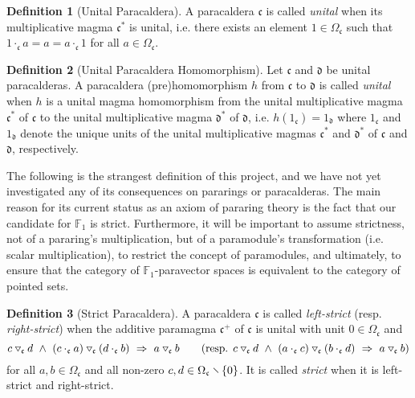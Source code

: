 \documentclass{article}
\theoremstyle{definition}
\newtheorem{definition}{Definition}[section]
\newcommand{\impl}{~\Rightarrow~}
\newcommand{\conj}{~\land~}
\newcommand{\tridown}{\mathbin{\hspace{.1em}\raisebox{.02em}{\rotatebox[origin=c]{90}{$\triangleleft$}}}}
\newcommand{\comp}{\tridown}
\newcommand{\diff}{\mathbin{\hspace{-.2em}\raisebox{.06em}{\rotatebox[origin=c]{-45}{$-$}\hspace{-.24em}}}}
\begin{document}
\begin{definition}[Unital Paracaldera]
A paracaldera \(\mathfrak{c}\) is called \textit{unital} when its multiplicative magma \(\mathfrak{c}^\ast\) is unital, i.e. there exists an element \(1\in\Omega_\mathfrak{c}\) such that \(1\cdot_\mathfrak{c}a=a=a\cdot_\mathfrak{c}1\) for all \(a\in\Omega_\mathfrak{c}\).
\end{definition}

\begin{definition}[Unital Paracaldera Homomorphism]
Let \(\mathfrak{c}\) and \(\mathfrak{d}\) be unital paracalderas. A paracaldera (pre)homomorphism \(h\) from \(\mathfrak{c}\) to \(\mathfrak{d}\) is called \textit{unital} when \(h\) is a unital magma homomorphism from the unital multiplicative magma \(\mathfrak{c}^\ast\) of \(\mathfrak{c}\) to the unital multiplicative magma \(\mathfrak{d}^\ast\) of \(\mathfrak{d}\), i.e. \(h(1_\mathfrak{c})=1_\mathfrak{d}\) where \(1_\mathfrak{c}\) and \(1_\mathfrak{d}\) denote the unique units of the unital multiplicative magmas \(\mathfrak{c}^\ast\) and \(\mathfrak{d}^\ast\) of \(\mathfrak{c}\) and \(\mathfrak{d}\), respectively.
\end{definition}

The following is the strangest definition of this project, and we have not yet investigated any of its consequences on pararings or paracalderas. The main reason for its current status as an axiom of pararing theory is the fact that our candidate for \(\mathbb{F}_1\) is strict. Furthermore, it will be important to assume strictness, not of a pararing's multiplication, but of a paramodule's transformation (i.e. scalar multiplication), to restrict the concept of paramodules, and ultimately, to ensure that the category of \(\mathbb{F}_1\)-paravector spaces is equivalent to the category of pointed sets.

\begin{definition}[Strict Paracaldera]
A paracaldera \(\mathfrak{c}\) is called \textit{left-strict} (resp. \textit{right-strict}) when the additive paramagma \(\mathfrak{c}^+\) of \(\mathfrak{c}\) is unital with unit \(0\in\Omega_\mathfrak{c}\) and \[c\comp_\mathfrak{c}d\conj(c\cdot_\mathfrak{c}a)\comp_\mathfrak{c}(d\cdot_\mathfrak{c}b)\impl a\comp_\mathfrak{c}b\qquad(\text{resp. }c\comp_\mathfrak{c}d\conj(a\cdot_\mathfrak{c}c)\comp_\mathfrak{c}(b\cdot_\mathfrak{c}d)\impl a\comp_\mathfrak{c}b)\] for all \(a,b\in\Omega_\mathfrak{c}\) and all non-zero \(c,d\in\Omega_\mathfrak{c}\diff\{0\}\). It is called \textit{strict} when it is left-strict and right-strict.
\end{definition}
\end{document}

